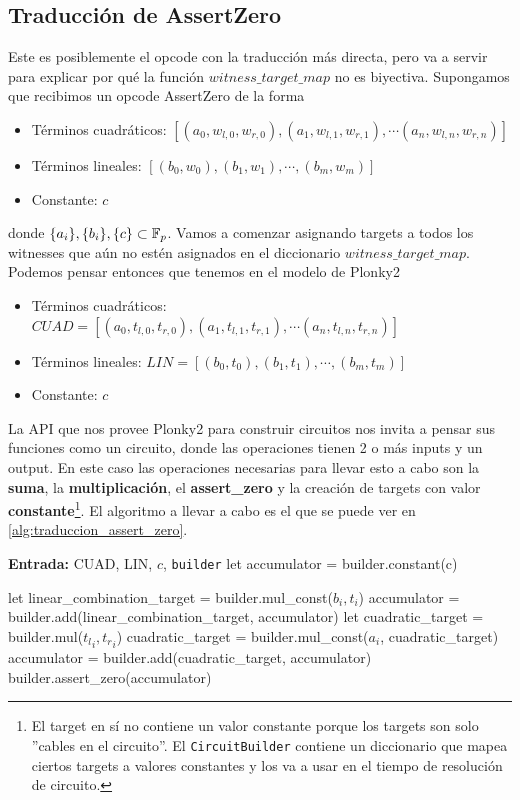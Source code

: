 \subsection{Traducción de AssertZero}
Este es posiblemente el opcode con la traducción más directa, pero va a servir para explicar por qué la función $witness\_target\_map$ no es biyectiva. Supongamos que recibimos un opcode AssertZero de la forma 
\begin{itemize}
    \item Términos cuadráticos: $[(a_0, w_{l,0}, w_{r,0}), (a_1, w_{l,1}, w_{r,1}), \cdots (a_n, w_{l,n}, w_{r,n})]$
    \item Términos lineales: $[(b_0, w_0), (b_1, w_1), \cdots, (b_m, w_m)]$
    \item Constante: $c$
\end{itemize}
donde $\{a_i\},\{b_i\},\{c\} \subset \mathbb{F}_p$. Vamos a comenzar asignando targets a todos los witnesses que aún no estén asignados en el diccionario $witness\_target\_map$. Podemos pensar entonces que tenemos en el modelo de Plonky2
\begin{itemize}
    \item Términos cuadráticos: $CUAD = [(a_0, t_{l,0}, t_{r,0}), (a_1, t_{l,1}, t_{r,1}), \cdots (a_n, t_{l,n}, t_{r,n})]$
    \item Términos lineales: $LIN = [(b_0, t_0), (b_1, t_1), \cdots, (b_m, t_m)]$
    \item Constante: $c$
\end{itemize}
La API que nos provee Plonky2 para construir circuitos nos invita a pensar sus funciones como un circuito, donde las operaciones tienen 2 o más inputs y un output. En este caso las operaciones necesarias para llevar esto a cabo son la \textbf{suma}, la \textbf{multiplicación}, el \textbf{assert\_zero} y la creación de targets con valor \textbf{constante}\footnote{El target en sí no contiene un valor constante porque los targets son solo ''cables en el circuito''. El \texttt{CircuitBuilder} contiene un diccionario que mapea ciertos targets a valores constantes y los va a usar en el tiempo de resolución de circuito.}. El algoritmo a llevar a cabo es el que se puede ver en \ref{alg:traduccion_assert_zero}.

\begin{algorithm}
\caption{Traducción del opcode AssertZero}
\begin{algorithmic}[1]
\State \textbf{Entrada:} CUAD, LIN, $c$, \texttt{builder}
\State let accumulator = builder.constant(c)

    \State let linear\_combination\_target = builder.mul\_const($b_i, t_i$)
    \State accumulator = builder.add(linear\_combination\_target, accumulator)
\EndFor
{}
    \State let cuadratic\_target = builder.mul(${t_l}_i, {t_r}_i$)
    \State cuadratic\_target = builder.mul\_const($a_i$, cuadratic\_target)
    \State accumulator = builder.add(cuadratic\_target, accumulator)
\EndFor
\State builder.assert\_zero(accumulator)

\end{algorithmic}
\label{alg:traduccion_assert_zero}
\end{algorithm}

